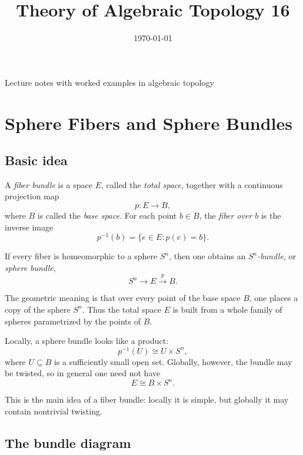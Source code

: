 \documentclass[12pt,a4paper]{article}
\title{\vspace{-1.5em}\bfseries Theory of Algebraic Topology 16}
\author{}
\date{\today}
\theoremstyle{notespace}
\begin{document}
	\maketitle
	\thispagestyle{plain}
		\begin{center}
		\begin{minipage}{0.92\textwidth}
			Lecture notes with worked examples in algebraic topology
		\end{minipage}
	\end{center}
		\tableofcontents
	\clearpage


\section{Sphere Fibers and Sphere Bundles}

\subsection{Basic idea}

A \emph{fiber bundle} is a space \(E\), called the \emph{total space}, together with a continuous projection map
\[
p:E\to B,
\]
where \(B\) is called the \emph{base space}. For each point \(b\in B\), the \emph{fiber over \(b\)} is the inverse image
\[
p^{-1}(b)=\{e\in E:p(e)=b\}.
\]

If every fiber is homeomorphic to a sphere \(S^n\), then one obtains an \emph{\(S^n\)-bundle}, or \emph{sphere bundle},
\[
S^n \longrightarrow E \xrightarrow{p} B.
\]

The geometric meaning is that over every point of the base space \(B\), one places a copy of the sphere \(S^n\). Thus the total space \(E\) is built from a whole family of spheres parametrized by the points of \(B\).

Locally, a sphere bundle looks like a product:
\[
p^{-1}(U)\cong U\times S^n,
\]
where \(U\subseteq B\) is a sufficiently small open set. Globally, however, the bundle may be twisted, so in general one need not have
\[
E\cong B\times S^n.
\]

This is the main idea of a fiber bundle: locally it is simple, but globally it may contain nontrivial twisting.

\subsection{The bundle diagram}
\end{document}
